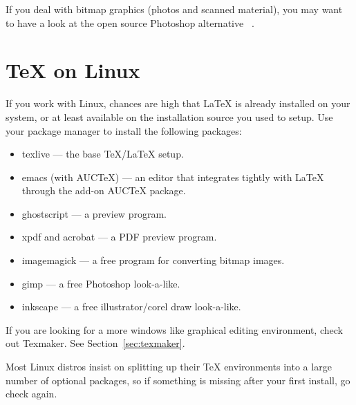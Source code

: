 If you deal with bitmap graphics (photos and scanned material), you may want
to have a look at the open source Photoshop alternative ~\cite{gimp}.

\section{\TeX{} on Linux}

If you work with Linux, chances are high that \LaTeX{} is already installed
on your system, or at least available on the installation source you used to
setup. Use your package manager to install the following packages:

\begin{itemize}
  \item texlive --- the base \TeX{}/\LaTeX{} setup.
  \item emacs (with AUCTeX) --- an editor that integrates tightly with \LaTeX{} through the add-on AUCTeX package.
  \item ghostscript --- a \PSi{} preview program.
  \item xpdf and acrobat --- a PDF preview program.
  \item imagemagick --- a free program for converting bitmap images.
  \item gimp --- a free Photoshop look-a-like.
  \item inkscape --- a free illustrator/corel draw look-a-like.
\end{itemize}

If you are looking for a more windows like graphical editing environment,
check out Texmaker. See Section~\ref{sec:texmaker}.

Most Linux distros insist on splitting up their \TeX{} environments into a
large number of optional packages, so if something is missing after your
first install, go check again.
